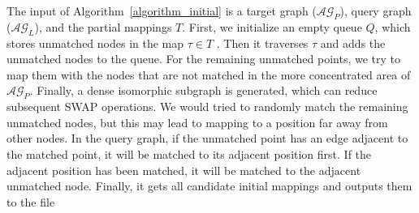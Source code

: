 \documentclass[runningheads]{llncs}
\begin{document}
The input of Algorithm~\ref{algorithm_initial} is a target graph ($\mathcal{AG}_{P}$), 
query graph ($\mathcal{AG}_{L}$), and the partial mappings $T$.
First, we initialize an empty queue $Q$, 
which stores unmatched nodes in the map $\tau \in T$ .
Then it traverses $\tau$ and adds the unmatched nodes to the queue. 
For the remaining unmatched points, we try to map them with the nodes that are not 
matched in the more concentrated area of $\mathcal{AG}_{P}$.
Finally, a dense isomorphic subgraph is generated, which can reduce subsequent SWAP operations.
We would tried to randomly match the remaining unmatched nodes, 
but this may lead to mapping to a position far away from other nodes.
In the query graph, if the unmatched point has an edge adjacent to the matched point, 
it will be matched to its adjacent position first.
If the adjacent position has been matched, 
it will be matched to the adjacent unmatched node.
Finally, it gets all candidate initial mappings and outputs them to the file
\end{document}
